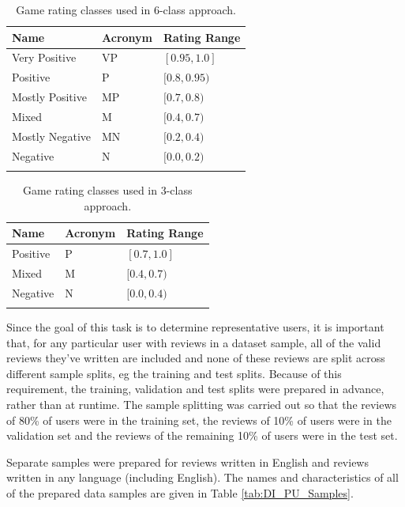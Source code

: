 \begin{table}[ht]
    \centering
    \begin{tabular}{l l l}
        \toprule
        \textbf{Name} & \textbf{Acronym} & \textbf{Rating Range}\\\midrule
        Very Positive & VP & $[0.95, 1.0]$\\
        Positive & P & $[0.8, 0.95)$\\
        Mostly Positive & MP & $[0.7, 0.8)$\\
        Mixed & M & $[0.4, 0.7)$\\
        Mostly Negative & MN & $[0.2, 0.4)$\\
        Negative & N & $[0.0, 0.2)$\\
        \bottomrule\\
    \end{tabular}
    \caption{Game rating classes used in 6-class approach.}
    \label{tab:DI_PU_Classes6}
\end{table}

\begin{table}[ht]
    \centering
    \begin{tabular}{l l l}
        \toprule
        \textbf{Name} & \textbf{Acronym} & \textbf{Rating Range}\\\midrule
        Positive & P & $[0.7, 1.0]$\\
        Mixed & M & $[0.4, 0.7)$\\
        Negative & N & $[0.0, 0.4)$\\
        \bottomrule\\
    \end{tabular}
    \caption{Game rating classes used in 3-class approach.}
    \label{tab:DI_PU_Classes3}
\end{table}

Since the goal of this task is to determine representative users, it is important that, for any particular user with reviews in a dataset sample, all of the valid reviews they've written are included and none of these reviews are split across different sample splits, eg the training and test splits. Because of this requirement, the training, validation and test splits were prepared in advance, rather than at runtime. The sample splitting was carried out so that the reviews of 80\% of users were in the training set, the reviews of 10\% of users were in the validation set and the reviews of the remaining 10\% of users were in the test set.

Separate samples were prepared for reviews written in English and reviews written in any language (including English). The names and characteristics of all of the prepared data samples are given in Table \ref{tab:DI_PU_Samples}.

